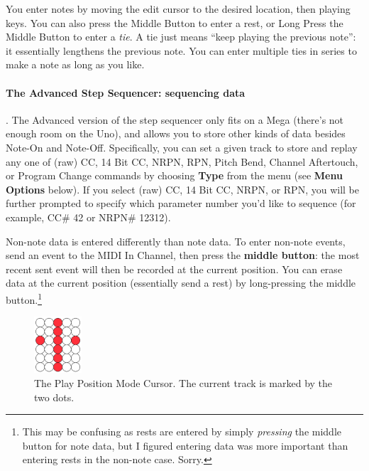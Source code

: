 \documentclass{article}
\begin{document}
You enter notes by moving the edit cursor to the desired location, then playing keys.  You can also press the Middle Button to enter a rest, or Long Press the Middle Button to enter a {\it tie}.  A tie just means ``keep playing the previous note'': it essentially lengthens the previous note.  You can enter multiple ties in series to make a note as long as you like.

\paragraph{The Advanced Step Sequencer: sequencing data}.  The Advanced version of the step sequencer only fits on a Mega (there's not enough room on the Uno), and allows you to store other kinds of data besides Note-On and Note-Off.  Specifically, you can set a given track to store and replay any one of (raw) CC, 14 Bit CC, NRPN, RPN, Pitch Bend, Channel Aftertouch, or Program Change commands by choosing {\bf Type} from the menu (see {\bf Menu Options} below).  If you select (raw) CC, 14 Bit CC, NRPN, or RPN, you will be further prompted to specify which parameter number you'd like to sequence (for example, CC\# 42 or NRPN\# 12312).

Non-note data is entered differently than note data.  To enter non-note events, send an event to the MIDI In Channel, then press the {\bf middle button}: the most recent sent event will then be recorded at the current position.  You can erase data at the current position (essentially send a rest) by long-pressing the middle button.\footnote{This may be confusing as rests are entered by simply {\it pressing} the middle button for note data, but I figured entering data was more important than entering rests in the non-note case.  Sorry.}

\begin{figure}
\vspace{-1em}\hspace{\fill}\includegraphics[width=0.7in]{playpositionmode}\hspace{\fill}%
\vspace{-1em}
\caption{\small The Play Position Mode Cursor.  The current track is marked by the two dots.}
\vspace{-1em}
\label{playpositionmode}
\end{figure}
\end{document}
